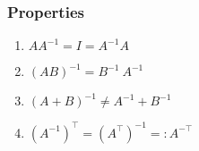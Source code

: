 \subsubsection{Properties}

\begin{multicols}{2}
\begin{enumerate}[itemsep=0.2cm]
    \item $AA^{-1} = I = A^{-1}A$
    \hfill \cite{mfml/book/mml/Deisenroth-Faisal-Ong}

    \item $(AB)^{-1} = B^{-1}\ A^{-1}$
    \hfill \cite{mfml/book/mml/Deisenroth-Faisal-Ong}

    \item $(A + B)^{-1} \neq A^{-1} + B^{-1}$
    \hfill \cite{mfml/book/mml/Deisenroth-Faisal-Ong}

    \item $(A^{-1})^\top = (A^\top)^{-1} =: A^{-\top}$
    \hfill \cite{mfml/book/mml/Deisenroth-Faisal-Ong}
    
\end{enumerate}
\end{multicols}


